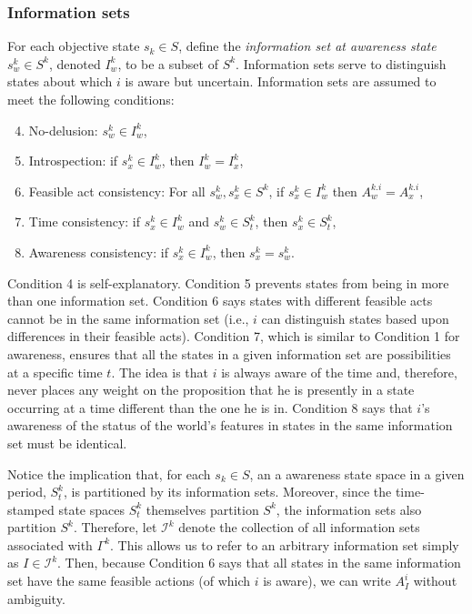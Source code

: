 \documentclass[
11pt,
titlepage,
reqno,
]{article}%
\theoremstyle{definition}
\begin{document}
\subsubsection{Information sets}
For each objective state $s_k\in S$, define the\textit{ information set at awareness state} $s^k_w\in S^k$, denoted $I^k_w$,  to be a subset of $S^k$.  
Information sets serve to distinguish states about which $i$ is aware but uncertain. 
Information sets are assumed to meet the following conditions:	
\begin{enumerate}
	\setcounter{enumi}{3}
	\item No-delusion: $s^k_w\in I^k_w$,
	\item Introspection: if $s^k_x\in I^k_w$, then $I^k_w=I^k_x$,
	\item Feasible act consistency: For all $s^k_w,s^k_x\in S^k$, if $s^k_x\in I^k_w$ then $A^{k.i}_w= A^{k.i}_x$,
	\item Time consistency: if $s^k_x\in I^k_w$ and $s^k_w\in S^k_t$, then $s^k_x\in S^k_t$,
	\item Awareness consistency: if $s^k_x\in I^k_w$, then $s^k_x=s^k_w$.
\end{enumerate}

Condition 4 is self-explanatory. 
Condition 5 prevents states from being in more than one information set.
Condition 6  says states with different feasible acts cannot be in the same information set (i.e., $i$ can distinguish states based upon differences in their feasible acts).
Condition 7, which is similar to Condition 1 for awareness, ensures that all the states in a given information set are possibilities at a specific time $t$.
The idea is that $i$ is always aware of the time and, therefore, never places any weight on the proposition that he is presently in a state occurring at a time different than the one he is in. 
Condition 8 says that $i$'s awareness of the status of the world's features in states in the same information set must be identical.

Notice the implication that, for each $s_k\in S$, an a awareness state space in a given period, $S^k_t$, is partitioned by its information sets.
Moreover, since the time-stamped state spaces $S^k_t$ themselves partition $S^k$, the information sets also partition $S^k$.
Therefore, let $\mathcal{I}^k$ denote the collection of all information sets associated with $\Gamma^k$.
This allows us to refer to an arbitrary information set simply as $I\in\mathcal{I}^k$.
Then, because Condition 6 says that all states in the same information set have the same feasible actions (of which $i$ is aware), we can write $A^i_I$ without ambiguity.
	
\end{document}
